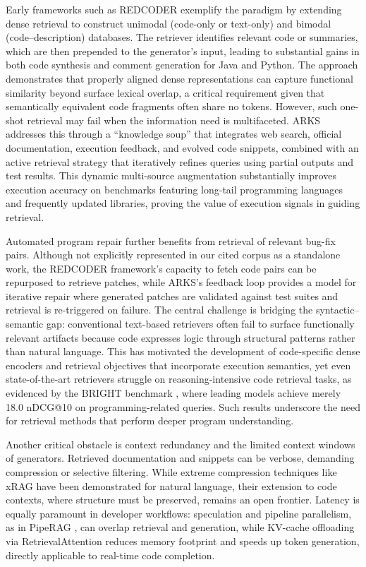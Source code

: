 \documentclass[11pt,a4paper]{article}
\begin{document}
Early frameworks such as REDCODER \cite{arxiv:2108.11601v2} exemplify the paradigm by extending dense retrieval to construct unimodal (code-only or text-only) and bimodal (code--description) databases. The retriever identifies relevant code or summaries, which are then prepended to the generator's input, leading to substantial gains in both code synthesis and comment generation for Java and Python. The approach demonstrates that properly aligned dense representations can capture functional similarity beyond surface lexical overlap, a critical requirement given that semantically equivalent code fragments often share no tokens. However, such one-shot retrieval may fail when the information need is multifaceted. ARKS \cite{arxiv:2402.12317v1} addresses this through a ``knowledge soup'' that integrates web search, official documentation, execution feedback, and evolved code snippets, combined with an active retrieval strategy that iteratively refines queries using partial outputs and test results. This dynamic multi-source augmentation substantially improves execution accuracy on benchmarks featuring long-tail programming languages and frequently updated libraries, proving the value of execution signals in guiding retrieval.

Automated program repair further benefits from retrieval of relevant bug-fix pairs. Although not explicitly represented in our cited corpus as a standalone work, the REDCODER framework's capacity to fetch code pairs can be repurposed to retrieve patches, while ARKS's feedback loop provides a model for iterative repair where generated patches are validated against test suites and retrieval is re-triggered on failure. The central challenge is bridging the syntactic--semantic gap: conventional text-based retrievers often fail to surface functionally relevant artifacts because code expresses logic through structural patterns rather than natural language. This has motivated the development of code-specific dense encoders and retrieval objectives that incorporate execution semantics, yet even state-of-the-art retrievers struggle on reasoning-intensive code retrieval tasks, as evidenced by the BRIGHT benchmark \cite{arxiv:2407.12883v1}, where leading models achieve merely 18.0 nDCG@10 on programming-related queries. Such results underscore the need for retrieval methods that perform deeper program understanding.

Another critical obstacle is context redundancy and the limited context windows of generators. Retrieved documentation and snippets can be verbose, demanding compression or selective filtering. While extreme compression techniques like xRAG \cite{arxiv:2405.13792v1} have been demonstrated for natural language, their extension to code contexts, where structure must be preserved, remains an open frontier. Latency is equally paramount in developer workflows: speculation and pipeline parallelism, as in PipeRAG \cite{arxiv:2403.05676v1}, can overlap retrieval and generation, while KV-cache offloading via RetrievalAttention \cite{arxiv:2409.10516v2} reduces memory footprint and speeds up token generation, directly applicable to real-time code completion.
\end{document}
